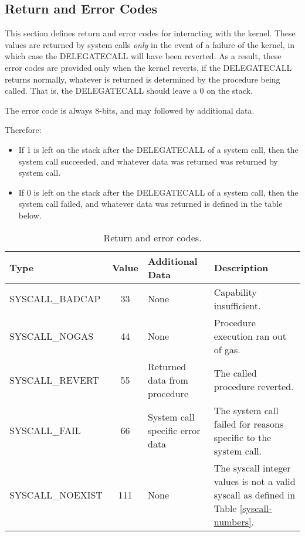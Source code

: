 \documentclass[english,a4paper]{article}
\begin{document}
\subsection{Return and Error Codes}\label{errors}
This section defines return and error codes for interacting with the kernel.
These values are returned by system calls \emph{only} in the event of a failure
of the kernel, in which case the DELEGATECALL will have been reverted. As a
result, these error codes are provided only when the kernel reverts, if the
DELEGATECALL returns normally, whatever is returned is determined by the
procedure being called. That is, the DELEGATECALL should leave a 0 on the stack.

The error code is always 8-bits, and may followed by additional data.

Therefore:

\begin{itemize}
  \item If 1 is left on the stack after the DELEGATECALL of a system call, then
  the system call succeeded, and whatever data was returned was returned by
  system call.
  \item If 0 is left on the stack after the DELEGATECALL of a system call, then
  the system call failed, and whatever data was returned is defined in the table
  below.
\end{itemize}

\begin{table}[H]
  \caption{Return and error codes.}
  \centering{}%
  \begin{tabularx}{\textwidth}{l|c|X|X}
    \hline
    Type & Value & Additional Data & Description \\
    \hline
    \hline
    SYSCALL\_BADCAP  & 33 & None & Capability insufficient. \\
    SYSCALL\_NOGAS   & 44 & None & Procedure execution ran out of gas. \\
    SYSCALL\_REVERT  & 55 & Returned data from procedure & The called
      procedure reverted. \\
    SYSCALL\_FAIL    & 66 & System call specific error data & The system call
      failed for reasons specific to the system call. \\
    SYSCALL\_NOEXIST & 111 & None & The syscall integer values is not a valid
      syscall as defined in Table \ref{syscall-numbers}. \\
    \hline
  \end{tabularx}
\end{table}
\end{document}
